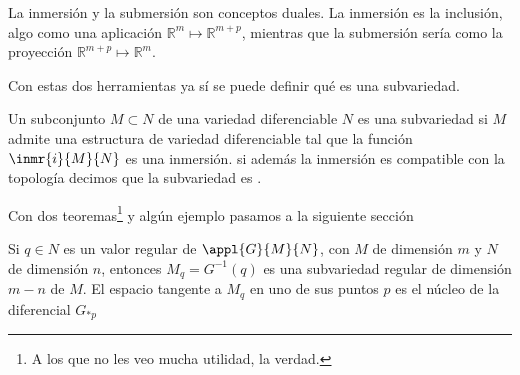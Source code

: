 La inmersión y la submersión son conceptos duales. La inmersión es la inclusión, algo como una aplicación $ℝ^m \longmapsto ℝ^{m+p}$, mientras que la submersión sería como la proyección $ℝ^{m+p} \longmapsto ℝ^m$.

Con estas dos herramientas ya sí se puede definir qué es una subvariedad.

\begin{defn}[Subvariedad] Un subconjunto $M \subset N$ de una variedad diferenciable $N$ es una subvariedad si $M$ admite una estructura de variedad diferenciable tal que la función $\inmr{i}{M}{N}$ es una inmersión. si además la inmersión es compatible con la topología decimos que la subvariedad es .
\end{defn}

Con dos teoremas\footnote{A los que no les veo mucha utilidad, la verdad.} y algún ejemplo pasamos a la siguiente sección

\begin{theorem}
Si $q \in N$ es un valor regular de $\appl{G}{M}{N}$, con $M$ de dimensión $m$ y $N$ de dimensión $n$, entonces $M_q=G^{-1}(q)$ es una subvariedad regular de dimensión $m-n$ de $M$. El espacio tangente a $M_q$ en uno de sus puntos $p$ es el núcleo de la diferencial $G_{*p}$
\end{theorem}

